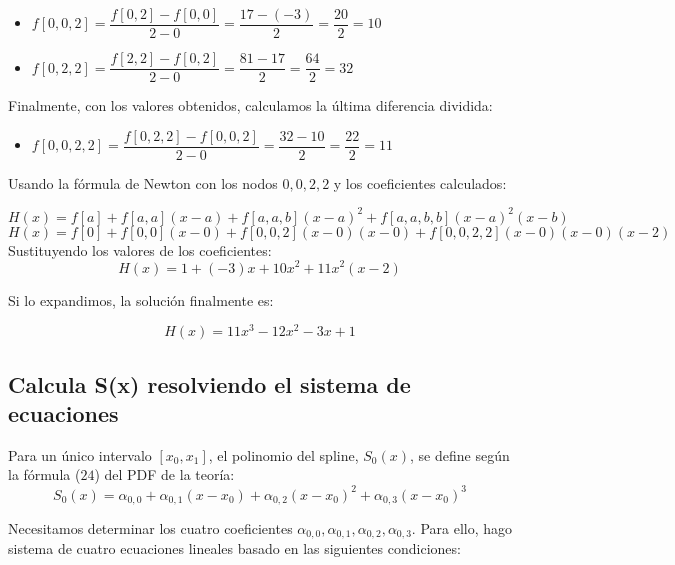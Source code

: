 \documentclass{article}
\begin{document}
\begin{itemize}
    \item \(f[0,0,2] = \dfrac{f[0,2] - f[0,0]}{2-0} = \dfrac{17 - (-3)}{2} = \dfrac{20}{2} = 10\)
    \item  \(f[0,2,2] = \dfrac{f[2,2] - f[0,2]}{2-0} = \dfrac{81 - 17}{2} = \dfrac{64}{2} = 32\)
\end{itemize}

Finalmente, con los valores obtenidos, calculamos la última diferencia dividida:

\begin{itemize}
    \item \(f[0,0,2,2] = \dfrac{f[0,2,2] - f[0,0,2]}{2-0} = \dfrac{32 - 10}{2} = \dfrac{22}{2} = 11\)
\end{itemize}

Usando la fórmula de Newton con los nodos \(0,0,2,2\) y los coeficientes calculados:

\begin{equation}
H(x) = f[a] + f[a,a](x-a) + f[a,a,b](x-a)^2 + f[a,a,b,b](x-a)^2(x-b)
\end{equation}
\begin{equation}
H(x) = f[0] + f[0,0](x-0) + f[0,0,2](x-0)(x-0) + f[0,0,2,2](x-0)(x-0)(x-2)
\end{equation}
Sustituyendo los valores de los coeficientes:
\begin{equation}
H(x) = 1 + (-3)x + 10x^2 + 11x^2(x-2)
\end{equation}

Si lo expandimos, la solución finalmente es:

$$ \boxed{H(x) = 11x^3 - 12x^2 - 3x + 1} $$

\subsection{Calcula S(x) resolviendo el sistema de ecuaciones}

Para un único intervalo \([x_0, x_1]\), el polinomio del spline, \(S_0(x)\), se define según la fórmula ($24$) del PDF de la teoría:
\begin{equation}
S_0(x) = \alpha_{0,0} + \alpha_{0,1}(x-x_0) + \alpha_{0,2}(x-x_0)^2 + \alpha_{0,3}(x-x_0)^3
\end{equation}

Necesitamos determinar los cuatro coeficientes \(\alpha_{0,0}, \alpha_{0,1}, \alpha_{0,2}, \alpha_{0,3}\). Para ello, hago sistema de cuatro ecuaciones lineales basado en las siguientes condiciones:
\end{document}

